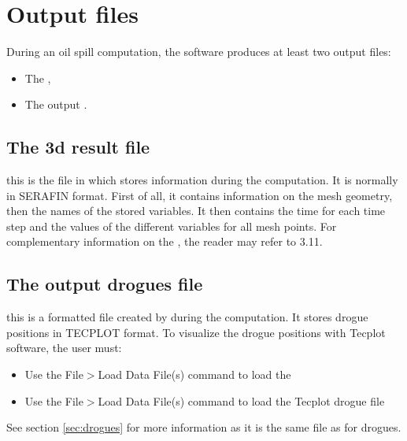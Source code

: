 \section{Output files}

During an oil spill computation, the  software produces at least two
output files:

\begin{itemize}
\item The ,

\item The output .
\end{itemize}


\subsection{The 3d result file}

this is the file in which  stores information during the computation.
It is normally in SERAFIN format. First of all, it contains information on the
mesh geometry, then the names of the stored variables. It then contains the
time for each time step and the values of the different variables for all mesh
points. For complementary information on the , the
reader may refer to 3.11.


\subsection{The output drogues file}

this is a formatted file created by  during the computation. It
stores drogue positions in TECPLOT format. To visualize the drogue positions
with Tecplot software, the user must:

\begin{itemize}
\item Use the File$>$Load Data File(s) command to load the 

\item Use the File$>$Load Data File(s) command to load the Tecplot drogue file
\end{itemize}

See section \ref{sec:drogues} for more information as it is the same file as for drogues.
